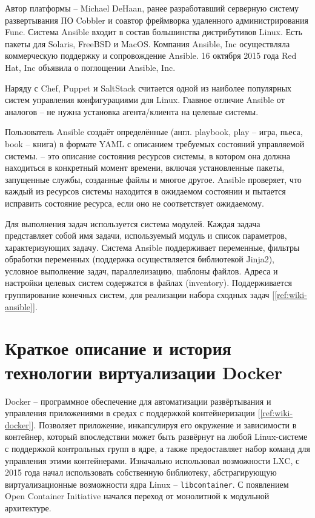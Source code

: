Автор платформы -- Michael DeHaan, ранее разработавший серверную систему
развертывания ПО Cobbler и соавтор фреймворка удаленного
администрирования Func. Система Ansible входит в состав большинства
дистрибутивов Linux. Есть пакеты для Solaris, FreeBSD и MacOS. Компания Ansible,
Inc осуществляла коммерческую поддержку и сопровождение Ansible. 16 октября 2015
года Red Hat, Inc объявила о поглощении Ansible, Inc.

Наряду с Chef, Puppet и SaltStack считается одной из наиболее популярных систем
управления конфигурациями для Linux. Главное отличие Ansible от аналогов -- не
нужна установка агента/клиента на целевые системы.

Пользователь Ansible создаёт определённые  (англ. playbook,
play -- игра, пьеса, book -- книга) в формате YAML с описанием требуемых
состояний управляемой системы.  -- это описание состояния
ресурсов системы, в котором она должна находиться в конкретный момент времени,
включая установленные пакеты, запущенные службы, созданные файлы и многое
другое. Ansible проверяет, что каждый из ресурсов системы находится в ожидаемом
состоянии и пытается исправить состояние ресурса, если оно не соответствует
ожидаемому.

Для выполнения задач используется система модулей. Каждая задача представляет
собой имя задачи, используемый модуль и список параметров, характеризующих
задачу. Система Ansible поддерживает переменные, фильтры обработки переменных
(поддержка осуществляется библиотекой Jinja2), условное
выполнение задач, параллелизацию, шаблоны файлов. Адреса и настройки целевых
систем содержатся в файлах  (inventory). Поддерживается
группирование конечных систем, для реализации набора сходных задач
[\ref{ref:wiki-ansible}].

\section{Краткое описание и история технологии виртуализации Docker}
Docker -- программное обеспечение для автоматизации развёртывания
и управления приложениями в средах с поддержкой контейнеризации
[\ref{ref:wiki-docker}].
Позволяет  приложение, инкапсулируя его окружение и
зависимости в контейнер, который впоследствии может быть развёрнут на любой
Linux-системе с поддержкой контрольных групп в ядре, а также предоставляет набор
команд для управления этими контейнерами.
Изначально использовал возможности LXC, с 2015 года начал использовать
собственную библиотеку, абстрагирующую виртуализационные возможности ядра Linux
-- \texttt{libcontainer}.
С появлением Open Container Initiative начался переход от монолитной к модульной
архитектуре.

